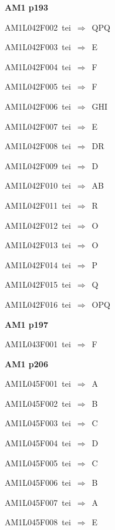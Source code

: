 \par\vfill\eject
{\bf\hfill AM1 p193\hfill\hbox{}}\par\bigskip
{\sixrm AM1L042F002\ {\sixit tei}\ }$\Rightarrow$\ QPQ\par\smallskip
{\sixrm AM1L042F003\ {\sixit tei}\ }$\Rightarrow$\ E\par\smallskip
{\sixrm AM1L042F004\ {\sixit tei}\ }$\Rightarrow$\ F\par\smallskip
{\sixrm AM1L042F005\ {\sixit tei}\ }$\Rightarrow$\ F\par\smallskip
{\sixrm AM1L042F006\ {\sixit tei}\ }$\Rightarrow$\ GHI\par\smallskip
{\sixrm AM1L042F007\ {\sixit tei}\ }$\Rightarrow$\ E\par\smallskip
{\sixrm AM1L042F008\ {\sixit tei}\ }$\Rightarrow$\ DR\par\smallskip
{\sixrm AM1L042F009\ {\sixit tei}\ }$\Rightarrow$\ D\par\smallskip
{\sixrm AM1L042F010\ {\sixit tei}\ }$\Rightarrow$\ AB\par\smallskip
{\sixrm AM1L042F011\ {\sixit tei}\ }$\Rightarrow$\ R\par\smallskip
{\sixrm AM1L042F012\ {\sixit tei}\ }$\Rightarrow$\ O\par\smallskip
{\sixrm AM1L042F013\ {\sixit tei}\ }$\Rightarrow$\ O\par\smallskip
{\sixrm AM1L042F014\ {\sixit tei}\ }$\Rightarrow$\ P\par\smallskip
{\sixrm AM1L042F015\ {\sixit tei}\ }$\Rightarrow$\ Q\par\smallskip
{\sixrm AM1L042F016\ {\sixit tei}\ }$\Rightarrow$\ OPQ\par\smallskip

\par\vfill\eject
{\bf\hfill AM1 p197\hfill\hbox{}}\par\bigskip
{\sixrm AM1L043F001\ {\sixit tei}\ }$\Rightarrow$\ F\par\smallskip

\par\vfill\eject
{\bf\hfill AM1 p206\hfill\hbox{}}\par\bigskip
{\sixrm AM1L045F001\ {\sixit tei}\ }$\Rightarrow$\ A\par\smallskip
{\sixrm AM1L045F002\ {\sixit tei}\ }$\Rightarrow$\ B\par\smallskip
{\sixrm AM1L045F003\ {\sixit tei}\ }$\Rightarrow$\ C\par\smallskip
{\sixrm AM1L045F004\ {\sixit tei}\ }$\Rightarrow$\ D\par\smallskip
{\sixrm AM1L045F005\ {\sixit tei}\ }$\Rightarrow$\ C\par\smallskip
{\sixrm AM1L045F006\ {\sixit tei}\ }$\Rightarrow$\ B\par\smallskip
{\sixrm AM1L045F007\ {\sixit tei}\ }$\Rightarrow$\ A\par\smallskip
{\sixrm AM1L045F008\ {\sixit tei}\ }$\Rightarrow$\ E\par\smallskip

